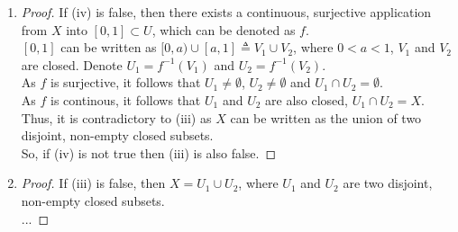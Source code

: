 \documentclass[paper=a4, fontsize=11pt]{scrartcl} %
\numberwithin{equation}{section} %
\numberwithin{figure}{section} %
\numberwithin{table}{section} %
\begin{document}
\begin{enumerate}
\begin{proof}
\begin{enumerate}
					So, $U_1$ and $U_2$ are both open and closed in $X$, which is contradictory to (i).\\
					Thus the assumption fails and (iii) is true when (i) is true.
				\item (iii) $\Rightarrow$ (i)\\
					Suppose (i) is not true, which means there exists $U$ s.t. $U \subset X$, $U \neq \emptyset$ and $U$ is both open and closed in $X$.\\
					Thus, $U^\complement$ is closed as $U$ is open.\\
					As $X = U \cup U^\complement$, then $X$ can be written as the union of two disjoint, non-empty closed subsets, which is contradictory to (iii).\\
					Thus the assumption fails and (i) holds true when (iii) is true. 
			\end{enumerate}
		\end{proof}
	\item
		\begin{proof}
			If (iv) is false, then there exists a continuous, surjective application from $X$ into $[0, 1]\subset U$, which can be denoted as $f$.\\
			$[0, 1]$ can be written as $[0, a) \cup [a, 1] \triangleq V_1 \cup V_2$, where $0 < a < 1$, $V_1$ and $V_2$ are closed. Denote $U_1 = f^{-1}(V_1)$ and  $U_2 = f^{-1}(V_2)$. \\
			As $f$ is surjective, it follows that $U_1 \neq \emptyset$, $U_2 \neq \emptyset$ and $U_1 \cap U_2 = \emptyset$. \\
			As $f$ is continous, it follows that $U_1$ and $U_2$ are also closed, $U_1 \cap U_2 = X$.\\
			Thus, it is contradictory to (iii) as $X$ can be written as the union of two disjoint, non-empty closed subsets.\\
			So, if (iv) is not true then (iii) is also false.
		\end{proof}
	\item 
		\begin{proof}
			If (iii) is false, then $X = U_1 \cup U_2$, where $U_1$ and $U_2$ are two disjoint, non-empty closed subsets.\\
			...
		\end{proof}
\end{enumerate}


\end{document}
